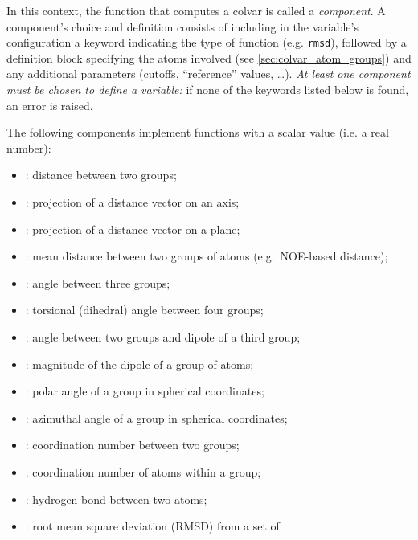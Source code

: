 
In this context, the function that computes a colvar is called a \emph{component}.
A component's choice and definition consists of including in the variable's configuration a keyword indicating the type of function (e.g.{} \texttt{rmsd}), followed by a definition block specifying the atoms involved (see \ref{sec:colvar_atom_groups}) and any additional parameters (cutoffs, ``reference'' values, \ldots).
\emph{At least one component must be chosen to define a variable:} if none of the keywords listed below is found, an error is raised.

The following components implement functions with a scalar value (i.e.{} a real number):
\begin{itemize}
\item {}: distance between two groups;
\item {}: projection of a distance vector on an axis;
\item {}: projection of a distance vector on a plane;
\item {}: mean distance between two groups of atoms (e.g.~NOE-based distance);
\item {}: angle between three groups;
\item {}: torsional (dihedral) angle between four groups;
\item {}: angle between two groups and dipole of a third group;
\item {}: magnitude of the dipole of a group of atoms;
\item {}: polar angle of a group in spherical coordinates;
\item {}: azimuthal angle of a group in spherical coordinates;
\item {}: coordination number between two groups;
\item {}: coordination number of atoms within a
  group;
\item {}: hydrogen bond between two atoms;
\item {}: root mean square deviation (RMSD) from a set of

\end{itemize}
